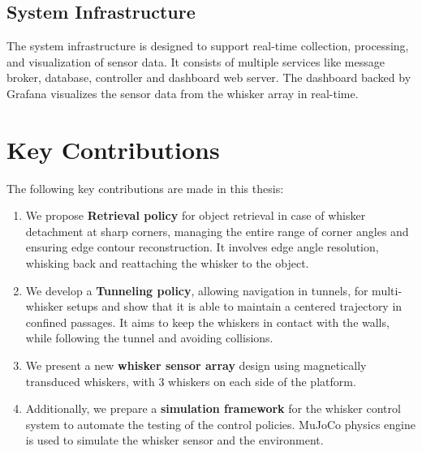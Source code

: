\subsection{System Infrastructure}
The system infrastructure is designed to support real-time collection, processing, and visualization of sensor data.
It consists of multiple services like message broker, database, controller and dashboard web server.
The dashboard backed by Grafana visualizes the sensor data from the whisker array in real-time.


\section{Key Contributions}
The following key contributions are made in this thesis:
\begin{enumerate}
    \item We propose \textbf{Retrieval policy} for object retrieval in case of whisker detachment at sharp corners, managing the entire range of corner angles and ensuring edge contour reconstruction.
    It involves edge angle resolution, whisking back and reattaching the whisker to the object.
    \item We develop a \textbf{Tunneling policy}, allowing navigation in tunnels, for multi-whisker setups and show that it is able to maintain a centered trajectory in confined passages.
    It aims to keep the whiskers in contact with the walls, while following the tunnel and avoiding collisions.
    \item We present a new \textbf{whisker sensor array} design using magnetically transduced whiskers, with 3 whiskers on each side of the platform.
    \item Additionally, we prepare a \textbf{simulation framework} for the whisker control system to automate the testing of the control policies.
    MuJoCo physics engine is used to simulate the whisker sensor and the environment.
\end{enumerate}
